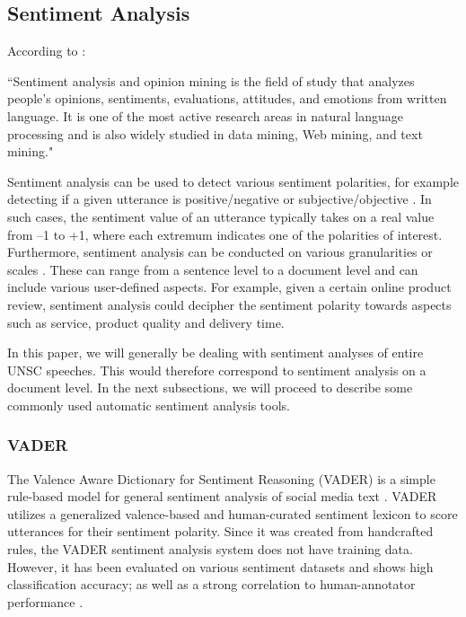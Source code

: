 \subsection{Sentiment Analysis}

According to \citet{liu2012sentiment}:

\begin{displayquote}
``Sentiment analysis and opinion mining is the field of study that analyzes people's opinions, sentiments, evaluations, attitudes, and emotions from written language. It is one of the most active research areas in natural language processing and is also widely studied in data mining, Web mining, and text mining."
\end{displayquote}

Sentiment analysis can be used to detect various sentiment polarities, for example detecting if a given utterance is positive/negative or subjective/objective \citep{liu2012sentiment}. In such cases, the sentiment value of an utterance typically takes on a real value from --1 to +1, where each extremum indicates one of the polarities of interest. Furthermore, sentiment analysis can be conducted on various granularities or scales \citep{liu2012sentiment}. These can range from a sentence level to a document level and can include various user-defined aspects. For example, given a certain online product review, sentiment analysis could decipher the sentiment polarity towards aspects such as service, product quality and delivery time.

In this paper, we will generally be dealing with sentiment analyses of entire UNSC speeches. This would therefore correspond to sentiment analysis on a document level. In the next subsections, we will proceed to describe some commonly used automatic sentiment analysis tools.

\subsubsection{VADER}

The Valence Aware Dictionary for Sentiment Reasoning (VADER) is a simple rule-based model for general sentiment analysis of social media text \citep{vader}. VADER utilizes a generalized valence-based and human-curated sentiment lexicon to score utterances for their sentiment polarity. Since it was created from handcrafted rules, the VADER sentiment analysis system does not have training data. However, it has been evaluated on various sentiment datasets and shows high classification accuracy; as well as a strong correlation to human-annotator performance \citep{vader}.

